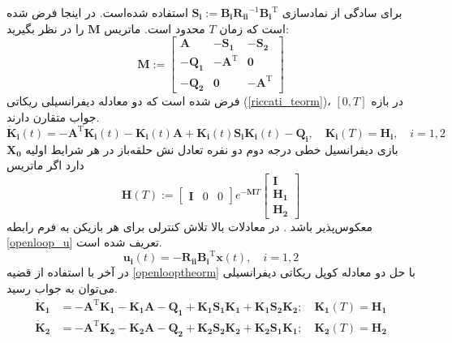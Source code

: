 برای سادگی از نمادسازی 
$\boldsymbol{S_i} := \boldsymbol{B_iR_{ii}}^{-1}\boldsymbol{B_i}^\mathrm{T}$
استفاده شده‌است. در اینجا فرض شده است که زمان $T$ محدود است.
 \label{openlooptheorm}
ماتریس
$\boldsymbol{M}$ را در نظر بگیرید:
\begin{equation}
	\boldsymbol{M} :=
	\begin{bmatrix}
		\boldsymbol{A} & -\boldsymbol{S_1} & -\boldsymbol{S_2}\\
		-\boldsymbol{Q_1} & -\boldsymbol{A}^\mathrm{T}& \boldsymbol{0}\\
		-\boldsymbol{Q_2} & \boldsymbol{0} & -\boldsymbol{A}^\mathrm{T}
	\end{bmatrix}
\end{equation}
فرض شده ‌است که دو معادله دیفرانسیلی ریکاتی
(\ref{riccati_teorm})، 
 در بازه
$[0, T]$
جواب متقارن دارند.
\begin{equation}\label{riccati_teorm}
	\boldsymbol{\dot{K}_i}(t) = -\boldsymbol{A}^\mathrm{T}\boldsymbol{K_i}(t)-\boldsymbol{K_i}(t)\boldsymbol{A}+\boldsymbol{K_i}(t)\boldsymbol{S_iK_i}(t)-\boldsymbol{Q_i},\quad \boldsymbol{K_i}(T) = \boldsymbol{H_i},\quad i = 1, 2
\end{equation}
\newpage
بازی دیفرانسیل خطی درجه دوم دو نفره تعادل نش حلقه‌باز در هر شرایط اولیه $\boldsymbol{X_0}
$
دارد اگر ماتریس
\begin{equation}
	\boldsymbol{H}(T) := \begin{bmatrix}
		\boldsymbol{I}&0&0
	\end{bmatrix}
e^{-\boldsymbol{M}T}
\begin{bmatrix}
	\boldsymbol{I}
	\\ \boldsymbol{H_{1}}
	\\ \boldsymbol{H_{2}}
\end{bmatrix}
\end{equation}
معکوس‌پذیر‌ باشد
 \cite{article1}
 .
در معادلات بالا تلاش کنترلی برای هر بازیکن به فرم رابطه \ref{openloop_u} تعریف شده است.
\begin{equation}\label{openloop_u}
	\boldsymbol{u_i}(t) = -\boldsymbol{R_{ii}}\boldsymbol{B_i}^\mathrm{T}\boldsymbol{x}(t),\quad i = 1, 2
\end{equation}
در آخر با استفاده از قضیه
 \ref{openlooptheorm}
با حل دو معادله کوپل ریکاتی دیفرانسیلی می‌توان به جواب رسید.
\begin{align}
	\boldsymbol{\dot{K}_1} &= -\boldsymbol{A}^\mathrm{T}\boldsymbol{K_1} - \boldsymbol{K_1A} - \boldsymbol{Q_1} +\boldsymbol{K_1S_1K_1} + \boldsymbol{K_1S_2K_2};\quad \boldsymbol{K_1}(T) = \boldsymbol{H_1}\\
	\boldsymbol{\dot{K}_2} &= -\boldsymbol{A}^\mathrm{T}\boldsymbol{K_2} - \boldsymbol{K_2A} - \boldsymbol{Q_2} +\boldsymbol{K_2S_2K_2} + \boldsymbol{K_2S_1K_1};\quad \boldsymbol{K_2}(T) = \boldsymbol{H_2}
\end{align}

